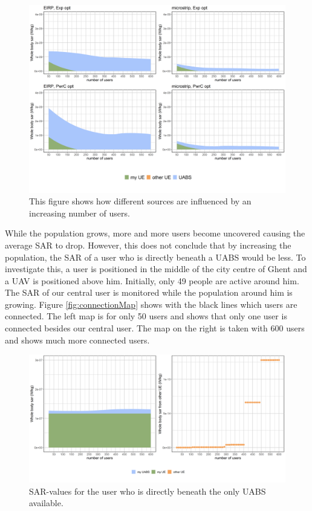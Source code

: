 \begin{figure}[h!]
\centering
  \includegraphics[width=\textwidth/6*5]{../results/s2/uFourSources.png}
  \caption{This figure shows how different sources are influenced by an increasing number of users. }
  \label{fig:s2fourSourcesMatrix}
\end{figure}

While the population grows, more and more users become uncovered causing the average SAR to drop. 
However, this does not conclude that  by increasing the population, the SAR of a user who is directly beneath a \gls{UABS} would be less.
To investigate this, a user is positioned in the middle of the city centre of Ghent and a \gls{UAV} is positioned above him. Initially, only 
49 people are active around him. The \gls{SAR} of our central user is monitored while the population around him is growing.
Figure \ref{fig:connectionMap} shows with the black lines which users are connected. The left map is for only 50 users and 
shows that only one user is connected besides our central user. The map on the right is taken with 600 users and shows much more connected users.

\begin{figure}[h!]
\centering
  \includegraphics[width=\textwidth/6*5]{../results/s2/uvsulsarcentralUser.png}
  \caption{SAR-values for the user who is directly beneath the only \gls{UABS} available.}
  \label{fig:uvsulsarcentralUsers}
\end{figure}

